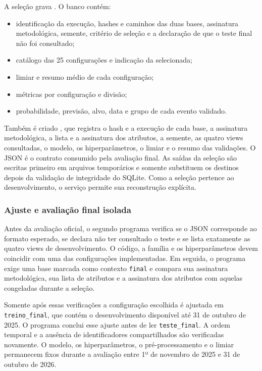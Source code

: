 \documentclass[12pt,a4paper]{article}
\begin{document}
A seleção grava . O banco contém:

\begin{itemize}
    \item identificação da execução, hashes e caminhos das duas bases,
    assinatura metodológica, semente, critério de seleção e a declaração de
    que o teste final não foi consultado;
    \item catálogo das 25 configurações e indicação da selecionada;
    \item limiar e resumo médio de cada configuração;
    \item métricas por configuração e divisão;
    \item probabilidade, previsão, alvo, data e grupo de cada evento validado.
\end{itemize}

Também é criado
, que registra o
hash e a execução de cada base, a assinatura metodológica, a lista e a
assinatura dos atributos, a semente, as quatro views consultadas, o modelo, os
hiperparâmetros, o limiar e o resumo das validações. O JSON é o contrato
consumido pela avaliação final. As saídas da
seleção são escritas primeiro em arquivos temporários e somente substituem os
destinos depois da validação de integridade do SQLite. Como a seleção pertence
ao desenvolvimento, o serviço permite sua reconstrução explícita.

\subsubsection{Ajuste e avaliação final isolada}

Antes da avaliação oficial, o segundo programa verifica se o JSON corresponde
ao formato esperado, se declara não ter consultado o teste e se lista
exatamente as quatro views de desenvolvimento. O código, a família e os
hiperparâmetros devem coincidir com uma das configurações implementadas. Em
seguida, o programa exige uma base marcada como contexto \texttt{final} e
compara sua assinatura metodológica, sua lista de atributos e a assinatura dos
atributos com aquelas congeladas durante a seleção.

Somente após essas verificações a configuração escolhida é ajustada em
\texttt{treino\_final}, que contém o desenvolvimento disponível até 31 de
outubro de 2025. O programa conclui esse ajuste antes de ler
\texttt{teste\_final}. A ordem temporal e a ausência de identificadores
compartilhados são verificadas novamente. O modelo, os hiperparâmetros, o
pré-processamento e o limiar permanecem fixos durante a avaliação entre 1º de
novembro de 2025 e 31 de outubro de 2026.
\end{document}
